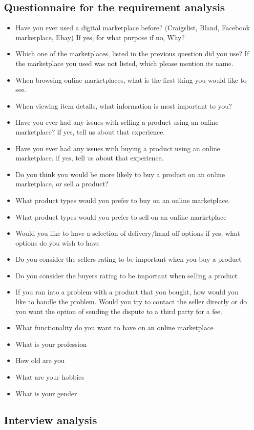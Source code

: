 \subsection{Questionnaire for the requirement analysis}
\begin{itemize}
    \item Have you ever used a digital marketplace before? (Craigslist, Bland, Facebook marketplace, Ebay)
    \subitem If yes, for what purpose
    \subitem if no, Why?
    \item Which one of the marketplaces, listed in the previous question did you use?
    \subitem If the marketplace you used was not listed, which please mention its name.
    \item When browsing online marketplaces, what is the first thing you would like to see.
    \item When viewing item details, what information is most important to you?
    \item Have you ever had any issues with selling a product using an online marketplace?
    \subitem if yes, tell us about that experience.
    \item Have you ever had any issues with buying a product using an online marketplace.
    \subitem if yes, tell us about that experience.
    \item Do you think you would be more likely to buy a product on an online marketplace, or sell a product?
    \item What product types would you prefer to buy on an online marketplace.
    \item What product types would you prefer to sell on an online marketplace
    \item Would you like to have a selection of delivery/hand-off options
    \subitem if yes, what options do you wish to have
    \item Do you consider the sellers rating to be important when you buy a product
    \item Do you consider the buyers rating to be important when selling a product
    \item If you ran into a problem with a product that you bought, how would you like to handle the problem. Would you try to contact the seller directly or do you want the option of sending the dispute to a third party for a fee.
    \item What functionality do you want to have on an online marketplace
    \item What is your profession
    \item How old are you
    \item What are your hobbies
    \item What is your gender
\end{itemize}
\subsection{Interview analysis}